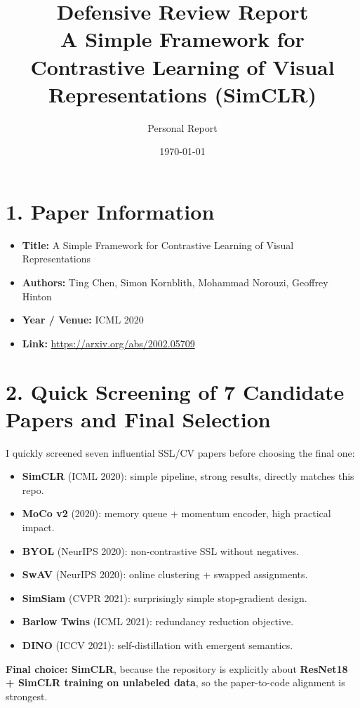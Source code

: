 \documentclass[11pt,a4paper]{article}
\title{\textbf{Defensive Review Report}\\A Simple Framework for Contrastive Learning of Visual Representations (SimCLR)}
\author{Personal Report}
\date{\today}
\begin{document}
\maketitle

\section*{1. Paper Information}
\begin{itemize}[leftmargin=1.5em]
    \item \textbf{Title:} A Simple Framework for Contrastive Learning of Visual Representations
    \item \textbf{Authors:} Ting Chen, Simon Kornblith, Mohammad Norouzi, Geoffrey Hinton
    \item \textbf{Year / Venue:} ICML 2020
    \item \textbf{Link:} \url{https://arxiv.org/abs/2002.05709}
\end{itemize}

\section*{2. Quick Screening of 7 Candidate Papers and Final Selection}
I quickly screened seven influential SSL/CV papers before choosing the final one:
\begin{itemize}[leftmargin=1.5em]
    \item \textbf{SimCLR} (ICML 2020): simple pipeline, strong results, directly matches this repo.
    \item \textbf{MoCo v2} (2020): memory queue + momentum encoder, high practical impact.
    \item \textbf{BYOL} (NeurIPS 2020): non-contrastive SSL without negatives.
    \item \textbf{SwAV} (NeurIPS 2020): online clustering + swapped assignments.
    \item \textbf{SimSiam} (CVPR 2021): surprisingly simple stop-gradient design.
    \item \textbf{Barlow Twins} (ICML 2021): redundancy reduction objective.
    \item \textbf{DINO} (ICCV 2021): self-distillation with emergent semantics.
\end{itemize}
\textbf{Final choice: SimCLR}, because the repository is explicitly about \textbf{ResNet18 + SimCLR training on unlabeled data}, so the paper-to-code alignment is strongest.
\end{document}
